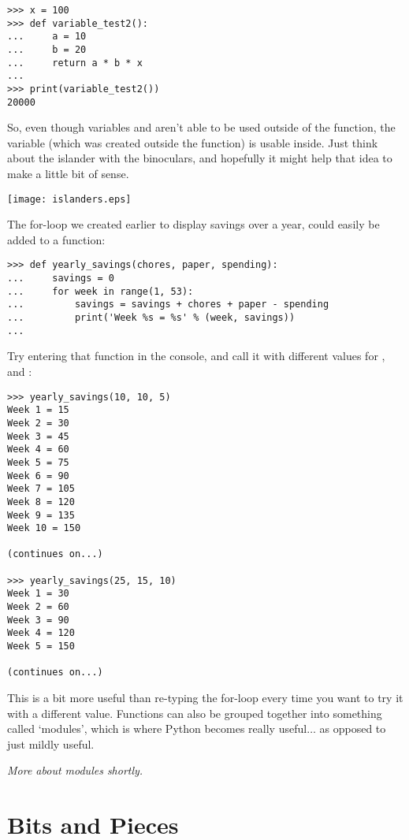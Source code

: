 \begin{Verbatim}[frame=single]
>>> x = 100
>>> def variable_test2():
...     a = 10
...     b = 20
...     return a * b * x
...
>>> print(variable_test2())
20000
\end{Verbatim}

So, even though variables  and  aren't able to be used outside of the function, the variable  (which was created outside the function) is usable inside.  Just think about the islander with the binoculars, and hopefully it might help that idea to make a little bit of sense.

\begin{center}
\texttt{[image: islanders.eps]}
\end{center}

The for-loop we created earlier to display savings over a year, could easily be added to a function:

\begin{Verbatim}[frame=single]
>>> def yearly_savings(chores, paper, spending):
...     savings = 0
...     for week in range(1, 53):
...         savings = savings + chores + paper - spending
...         print('Week %s = %s' % (week, savings))
...
\end{Verbatim}

Try entering that function in the console, and call it with different values for ,  and :

\begin{Verbatim}[frame=single]
>>> yearly_savings(10, 10, 5)
Week 1 = 15
Week 2 = 30
Week 3 = 45
Week 4 = 60
Week 5 = 75
Week 6 = 90
Week 7 = 105
Week 8 = 120
Week 9 = 135
Week 10 = 150

(continues on...)

>>> yearly_savings(25, 15, 10)
Week 1 = 30
Week 2 = 60
Week 3 = 90
Week 4 = 120
Week 5 = 150

(continues on...)
\end{Verbatim}

This is a bit more useful than re-typing the for-loop every time you want to try it with a different value. Functions can also be grouped together into something called `modules', which is where Python becomes really useful$\ldots$ as opposed to just mildly useful.
\par
\noindent
\emph{More about modules shortly.}

\section{Bits and Pieces}

